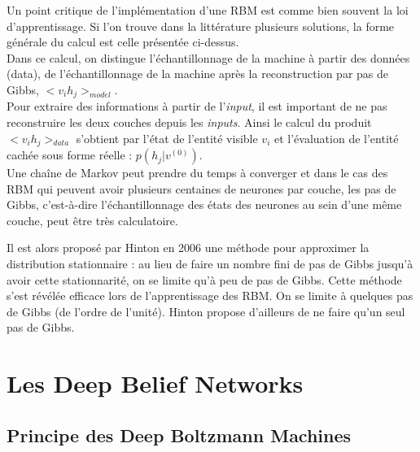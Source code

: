 \documentclass[a4paper,oneside]{report}
\begin{document}
                Un point critique de l'implémentation d'une RBM est comme bien souvent la loi 
d'apprentissage.
                Si l'on trouve dans la littérature plusieurs solutions, la forme générale du calcul 
est celle présentée ci-dessus.\\

Dans ce calcul, on distingue l'échantillonnage de la machine à partir des données 
(data), de l'échantillonnage de la machine après la reconstruction par pas de Gibbs, 
\begin{math}<v_{i}h_{j}>_{model}\end{math}.\\
                
                Pour extraire des informations à partir de l'\textit{input}, il est important de ne 
pas reconstruire les deux couches depuis les \textit{inputs}.
                Ainsi le calcul du produit \begin{math}<v_{i}h_{j}>_{data}\end{math} s'obtient par 
l'état de l'entité visible \begin{math}v_{i}\end{math} et l'évaluation de l'entité 
cachée sous forme réelle 
: \begin{math}p(h_{j}|v^{(0)})\end{math}.\\

Une chaîne de Markov peut prendre du temps à converger et dans le cas des RBM qui peuvent 
avoir plusieurs centaines de neurones par couche, les pas de Gibbs, c'est-à-dire l'échantillonnage
 des états des neurones au sein d'une même couche, peut être très calculatoire. 

Il est alors proposé par 
Hinton en 2006 une méthode pour approximer la distribution stationnaire : au lieu de faire un nombre
 fini de pas de Gibbs jusqu'à avoir cette stationnarité, on se limite qu'à peu de pas de Gibbs. Cette 
méthode s'est révélée efficace lors de l'apprentissage des RBM. On se limite à quelques pas de Gibbs (de l'ordre de l'unité).
Hinton propose d'ailleurs de ne faire qu'un seul pas de Gibbs.
				

        \chapter{Les Deep Belief Networks}

\section{Principe des Deep Boltzmann Machines}
\end{document}
